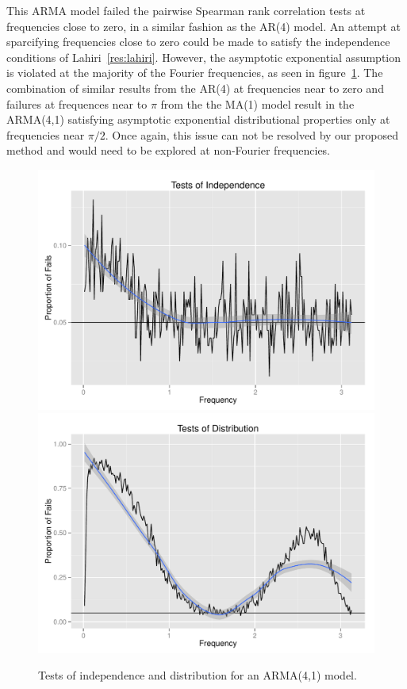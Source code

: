 \documentclass{article}\usepackage[]{graphicx}\usepackage[]{color}
\newenvironment{knitrout}{}{} %
\theoremstyle{plain}
\begin{document}
This ARMA model failed the pairwise Spearman rank correlation tests at frequencies close to zero, in a similar fashion as the AR(4) model. An attempt at sparcifying frequencies close to zero could be made to satisfy the independence conditions of Lahiri~\ref{res:lahiri}. However, the asymptotic exponential assumption is violated at the majority of the Fourier frequencies, as seen in figure~\ref{fig:tests-arma41}. The combination of similar results from the AR(4) at frequencies near to zero and failures at frequences near to $\pi$ from the the MA(1) model result in the ARMA(4,1) satisfying asymptotic exponential distributional properties only at frequencies near $\pi/2$. Once again, this issue can not be resolved by our proposed method and would need to be explored at non-Fourier frequencies.

\begin{knitrout}
\color{fgcolor}\begin{figure}[h]

\includegraphics[width=.49\textwidth]{figure/tests-arma411} 
\includegraphics[width=.49\textwidth]{figure/tests-arma412} \caption[Tests of independence and distribution for an ARMA(4,1) model]{Tests of independence and distribution for an ARMA(4,1) model.\label{fig:tests-arma41}}
\end{figure}


\end{knitrout}


% 
\end{document}

